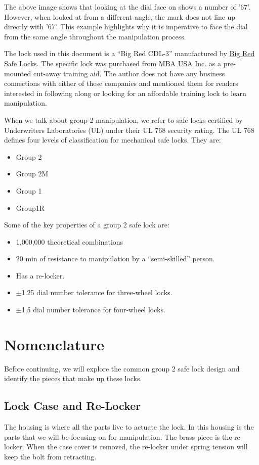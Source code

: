 \documentclass[11pt, letterpaper]{article}
\begin{document}
\noindent The above image shows that looking at the dial face on shows a number
of '67'. However, when looked at from a different angle, the mark does not line
up directly with '67'. This example highlights why it is imperative to face the
dial from the same angle throughout the manipulation process.

The lock used in this document is a ``Big Red CDL-3'' manufactured by
\href{http://www.bigredsafelocks.com/Home-page/}{Big Red Safe Locks}. The
specific lock was purchased from \href{https://mbausa.com}{MBA USA Inc.} as a
pre-mounted cut-away training aid. The author does not have any business
connections with either of these companies and mentioned them for readers
interested in following along or looking for an affordable training lock to
learn manipulation.

When we talk about group 2 manipulation, we refer to safe locks certified by
Underwriters Laboratories (UL) under their UL 768 security rating. The UL 768
defines four levels of classification for mechanical safe locks. They are:
\begin{itemize}
  \item{Group 2}
  \item{Group 2M}
  \item{Group 1}
  \item{Group1R}
\end{itemize}

Some of the key properties of a group 2 safe lock are:
\begin{itemize}
  \item{1,000,000 theoretical combinations}
  \item{20 min of resistance to manipulation by a ``semi-skilled'' person.}
  \item{Has a re-locker.}
  \item{$\pm$1.25 dial number tolerance for three-wheel locks.}
  \item{$\pm$1.5 dial number tolerance for four-wheel locks.}
\end{itemize}

\section*{Nomenclature}
Before continuing, we will explore the common group 2 safe lock design and
identify the pieces that make up these locks.

\subsection*{Lock Case and Re-Locker}
The housing is where all the parts live to actuate the lock. In this
housing is the parts that we will be focusing on for manipulation.
The brass piece is the re-locker. When the case cover is removed, the
re-locker under spring tension will keep the bolt from retracting.
\end{document}

